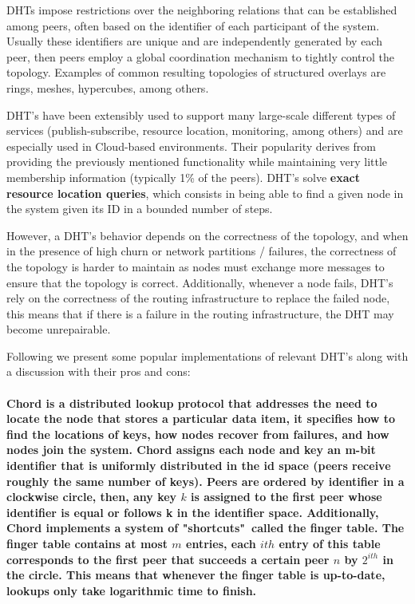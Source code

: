 DHTs impose restrictions over the neighboring relations that can be established among peers, often based on the identifier of each participant of the system. Usually these identifiers are unique and are independently generated by each peer, then peers employ a global coordination mechanism to tightly control the topology. Examples of common resulting topologies of structured overlays are rings, meshes, hypercubes, among others.

DHT's have been extensibly used to support many large-scale different types of services (publish-subscribe, resource location, monitoring, among others) and are especially used in Cloud-based environments. Their popularity derives from providing the previously mentioned functionality while maintaining very little membership information (typically 1\% of the peers). DHT's solve \textbf{exact resource location queries}, which consists in being able to find a given node in the system given its ID in a bounded number of steps.

However, a DHT's behavior depends on the correctness of the topology, and when in the presence of high churn or network partitions / failures, the correctness of the topology is harder to maintain as nodes must exchange more messages to ensure that the topology is correct. Additionally, whenever a node fails, DHT's rely on the correctness of the routing infrastructure to replace the failed node, this means that if there is a failure in the routing infrastructure, the DHT may become unrepairable.

Following we present some popular implementations of relevant DHT's along with a discussion with their pros and cons:

\paragraph{ \textbf{Chord} \cite{stoica2003chord} is a distributed lookup protocol that addresses the need to locate the node that stores a particular data item, it specifies how to find the locations of keys, how nodes recover from failures, and how nodes join the system. Chord assigns each node and key an m-bit identifier that is uniformly distributed in the id space (peers receive roughly the same number of keys). Peers are ordered by identifier in a clockwise circle, then, any key \(k\) is assigned to the first peer whose identifier is equal or follows k in the identifier space. Additionally, Chord implements a system of "shortcuts"\ called the \textbf{finger table}. The finger table contains at most \(m\) entries, each $ith$ entry of this table corresponds to the first peer that succeeds a certain peer \(n\) by \(2^{ith}\) in the circle. This means that whenever the finger table is up-to-date, lookups only take logarithmic time to finish. }
    
